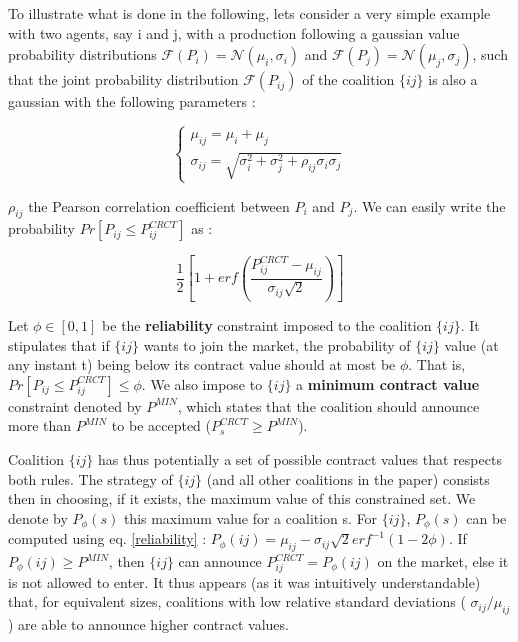 \documentclass[conference]{IEEEtran}
\begin{document}
To illustrate what is done in the following, lets consider a very simple example with two agents, say i and j, with a production following a gaussian value probability distributions $ \mathcal{F}(P_{i}) = \mathcal{N}(\mu_{i}, \sigma_{i}) $ and $ \mathcal{F}(P_{j}) = \mathcal{N}(\mu_{j}, \sigma_{j}) $, such that the joint probability distribution  $ \mathcal{F}(P_{ij}) $ of the coalition $\{ij\}$ is also a gaussian with the following parameters :

\begin{equation}
\left\{ \begin{array}{lll}
		\mu_{ij} = \mu_{i} + \mu_{j} \\
		\sigma_{ij} = \sqrt{\sigma_{i}^{2} + \sigma_{j}^{2} + \rho_{ij}\sigma_{i}\sigma_{j}}
\end{array} \right.
\label{parameters}
\end{equation}

$ \rho_{ij} $ the Pearson correlation coefficient between $ P_{i} $ and $ P_{j} $. We can easily write the probability $ Pr[P_{ij} \leq P_{ij}^{CRCT} ] $ as :

\begin{equation}
\dfrac{1}{2} \left[ 1+ erf \left( \dfrac{P_{ij}^{CRCT} - \mu_{ij}}{\sigma_{ij}\sqrt{2}} \right) \right]
\label{reliability}
\end{equation}

Let $ \phi \in [0,1] $ be the \textbf{reliability} constraint imposed to the coalition $\{ij\} $. It stipulates that if $\{ij\} $ wants to join the market, the probability of $\{ij\} $ value (at any instant t) being below its contract value should at most be $ \phi $. That is, $ Pr[P_{ij} \leq P_{ij}^{CRCT} ] \leq \phi $. We also impose to $ \{ij\} $ a \textbf{minimum contract value} constraint denoted by $ P^{MIN} $, which states that the coalition should announce more than $ P^{MIN} $ to be accepted ($ P_{s}^{CRCT} \geq P^{MIN} $).

Coalition $ \{ij\} $ has thus potentially a set of possible contract values that respects both rules. The strategy of $ \{ij\} $ (and all other coalitions in the paper) consists then in choosing, if it exists, the maximum value of this constrained set. We denote by $ P_{\phi}(s) $ this maximum value for a coalition s. For $ \{ij\} $, $ P_{\phi}(s) $ can be computed using eq. \ref{reliability} : $ P_{\phi}(ij) = \mu_{ij} - \sigma_{ij}\sqrt{2}erf^{-1}(1-2 \phi ) $. If  $ P_{\phi}(ij) \geq P^{MIN} $, then $ \{ij\} $ can announce $ P_{ij}^{CRCT} = P_{\phi}(ij)$ on the market, else it is not allowed to enter. It thus appears (as it was intuitively understandable) that, for equivalent sizes, coalitions with low relative standard deviations ( $ \sigma_{ij} / \mu_{ij} $ ) are able to announce higher contract values. 
\end{document}
